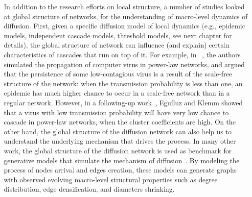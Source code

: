 \documentclass[phd,tocprelim]{cornell}
\begin{document}
In addition to the research efforts on local structure, a number of studies looked at global structure of networks, for the understanding of macro-level dynamics of diffusion. First, given a specific diffusion model of local dynamics (e.g., epidemic models, independent cascade models, threshold models, see next chapter for details), the global structure of network can influence (and explain) certain characteristics of cascades that run on top of it. For example,
in ~\cite{pastor-satorras01}, the authors simulated the propagation of computer
virus in power-law networks, and argued that the persistence of some low-contagious
virus is a result of the scale-free structure of the network: when the transmission probability is less than one, an epidemic has much higher chance to occur in a scale-free network than in a regular network. 
However, in a following-up work~\cite{Eguiluz-2002}, Egu\'{i}luz and Klemm showed that a virus with low transmission probability will have very low chance to cascade in power-law networks, when the cluster coefficients are high. On the other hand, the global structure of the diffusion network can also help us to understand the underlying mechanism that drives the process.
In many other work, the global structure of the diffusion network is used as benchmark for generative models that simulate the mechanism of diffusion~\cite{Eguiluz-2002,Gruhl-2004,Nowell-2008}. By modeling the process of nodes arrival and edges creation, these models can generate graphs with observed evolving macro-level structural properties such as degree distribution, edge densification, and diameters shrinking.

\end{document}

